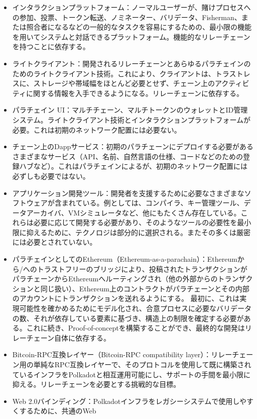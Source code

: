 \begin{itemize}
\item
  インタラクションプラットフォーム：ノーマルユーザーが、賭けプロセスへの参加、投票、トークン転送、ノミネーター、バリデータ、Fisherman、または照合者になるなどの一般的なタスクを容易にするための、最小限の機能を用いてシステムと対話できるプラットフォーム。機能的なリレーチェーンを持つことに依存する。
\item
  ライトクライアント：開発されるリレーチェーンとあらゆるパラチェインのためのライトクライアント技術。これにより、クライアントは、トラストレスに、ストレージや帯域幅をほとんど必要とせず、チェーン上のアクティビティに関する情報を入手できるようになる。リレーチェーンに依存する。
\item
  パラチェイン
  UI：マルチチェーン、マルチトークンのウォレットとID管理システム。ライトクライアント技術とインタラクションプラットフォームが必要。これは初期のネットワーク配置には必要ない。
\item
  チェーン上のDappサービス：初期のパラチェーンにデプロイする必要があるさまざまなサービス（API、名前、自然言語の仕様、コードなどのための登録ハブなど）。これはパラチェインによるが、初期のネットワーク配置には必ずしも必要ではない。
\item
  アプリケーション開発ツール：開発者を支援するために必要なさまざまなソフトウェアが含まれている。例としては、コンパイラ、キー管理ツール、データアーカイバ、VMシミュレータなど、他にもたくさん存在している。これらは必要に応じて開発する必要があり、そのようなツールの必要性を最小限に抑えるために、テクノロジは部分的に選択される。またその多くは厳密には必要とされていない。
\item
  パラチェインとしてのEthereum（Ethereum-as-a-parachain）：Ethereumから/へのトラストフリーのブリッジにより、投稿されたトランザクションがパラチェーンからEthereumへルーティングされ（他の外部からのトランザクションと同じ扱い）、Ethereum上のコントラクトがパラチェーンとその内部のアカウントにトランザクションを送れるようにする。
  最初に、これは実現可能性を確かめるためにモデル化され、合意プロセスに必要なバリデータの数、それが依存している要素に基づき、構造上の制限を確定する必要がある。これに続き、Proof-of-conceptを構築することができ、最終的な開発はリレーチェーン自体に依存する。
\item
  Bitcoin-RPC互換レイヤー（Bitcoin-RPC compatibility
  layer）：リレーチェーン用の単純なRPC互換レイヤーで、そのプロトコルを使用して既に構築されているインフラをPolkadotと相互運用可能にし、サポートの手間を最小限に抑える。リレーチェーンを必要とする挑戦的な目標。
\item
  Web
  2.0バインディング：Polkadotインフラをレガシーシステムで使用しやすくするために、共通のWeb

\end{itemize}
